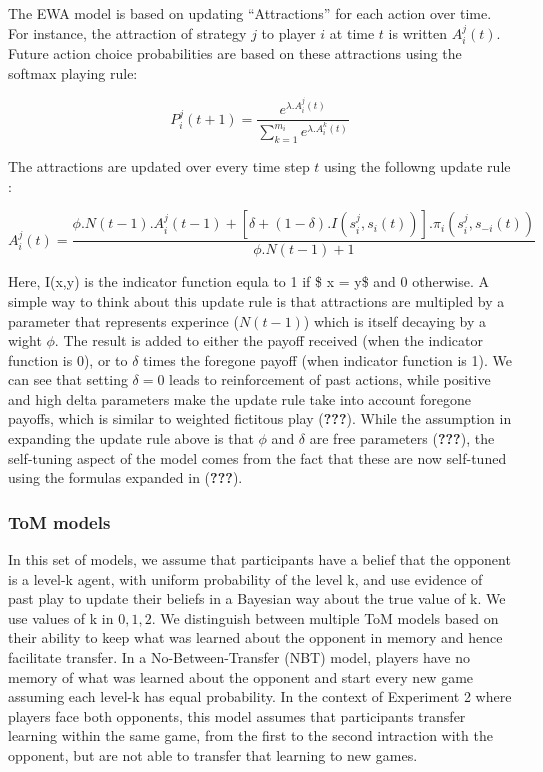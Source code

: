 \documentclass[man,floatsintext]{apa6}
\begin{document}
The EWA model is based on updating ``Attractions'' for each action over time. For instance, the attraction of strategy \(j\) to player \(i\) at time \(t\) is written \(A_{i}^{j}(t)\). Future action choice probabilities are based on these attractions using the softmax playing rule:

\[P_{i}^{j}(t+1) = \frac{e^{\lambda . A_{i}^{j}(t)}}{\sum_{k=1}^{m_{i}}e^{\lambda . A_{i}^{k}(t)}} \]

The attractions are updated over every time step \(t\) using the followng update rule :

\[ A_{i}^{j}(t) =  \frac{\phi . N(t-1) . A_{i}^{j}(t-1) + [ \delta + (1-\delta) . I(s_{i}^{j},s_{i}(t))] . \pi_{i}(s_{i}^{j},s_{-i}(t)) } {\phi . N(t-1) + 1} \]

Here, I(x,y) is the indicator function equla to 1 if \$ x = y\$ and 0 otherwise. A simple way to think about this update rule is that attractions are multipled by a parameter that represents experince (\(N(t-1)\)) which is itself decaying by a wight \(\phi\). The result is added to either the payoff received (when the indicator function is 0), or to \(\delta\) times the foregone payoff (when indicator function is 1). We can see that setting \(\delta = 0\) leads to reinforcement of past actions, while positive and high delta parameters make the update rule take into account foregone payoffs, which is similar to weighted fictitous play ({\textbf{???}}).
While the assumption in expanding the update rule above is that \(\phi\) and \(\delta\) are free parameters ({\textbf{???}}), the self-tuning aspect of the model comes from the fact that these are now self-tuned using the formulas expanded in ({\textbf{???}}).

\hypertarget{tom-models}{%
\subsubsection{ToM models}\label{tom-models}}

In this set of models, we assume that participants have a belief that the opponent is a level-k agent, with uniform probability of the level k, and use evidence of past play to update their beliefs in a Bayesian way about the true value of k. We use values of k in \({0,1,2}\). We distinguish between multiple ToM models based on their ability to keep what was learned about the opponent in memory and hence facilitate transfer. In a No-Between-Transfer (NBT) model, players have no memory of what was learned about the opponent and start every new game assuming each level-k has equal probability. In the context of Experiment 2 where players face both opponents, this model assumes that participants transfer learning within the same game, from the first to the second intraction with the opponent, but are not able to transfer that learning to new games.
\end{document}
